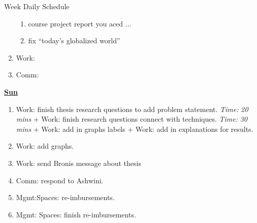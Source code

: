 \documentclass[serif, mathserif, final]{beamer}
\newcommand{\timeEst}[1]{\textit{Time:} \textit{#1}}
\begin{document}
\begin{frame}{}
\begin{columns}
\begin{column}{0.50\linewidth}
\begin{block}{Week Daily Schedule}
\begin{enumerate}
\begin{enumerate}
\item \tiny course project report  you aced ... 

\item \tiny fix  ``today's globalized world''
\end{enumerate} 
\item \tiny Work:
\item \tiny Comm: 
\end{enumerate} 

\textbf{\small \underline{Sun}}
\begin{enumerate} 
\tiny \item \tiny Work: finish thesis research questions to add 
problem statement. \timeEst{20 mins} + Work: finish research questions connect with 
techniques.  \timeEst{30 mins}  +  Work: add in graphs labels + Work: add in explanations 
for results. 

\item \tiny Work: add graphs. 

\item \tiny Work:  send Bronis message about thesis 

\item \tiny Comm: respond to Ashwini. 

\item \tiny Mgmt:Spaces: re-imbursements. 

\item \tiny Mgmt: Spaces: finish re-imbursements. 

\end{enumerate} 

\end{block} 
\end{column}%


\end{columns}
\end{frame}
\end{document}
